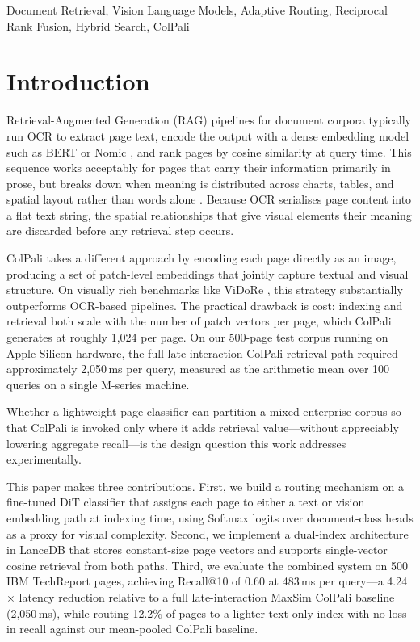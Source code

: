 \documentclass[conference]{IEEEtran}
\begin{document}
\begin{IEEEkeywords}
Document Retrieval, Vision Language Models, Adaptive Routing, Reciprocal Rank Fusion, Hybrid Search, ColPali
\end{IEEEkeywords}
 
\section{Introduction}
 
Retrieval-Augmented Generation (RAG) pipelines for document corpora typically run OCR to extract page text, encode the output with a dense embedding model such as BERT \cite{devlin2019} or Nomic \cite{nussbaum2024nomic}, and rank pages by cosine similarity at query time. This sequence works acceptably for pages that carry their information primarily in prose, but breaks down when meaning is distributed across charts, tables, and spatial layout rather than words alone \cite{blecher2023nougat}. Because OCR serialises page content into a flat text string, the spatial relationships that give visual elements their meaning are discarded before any retrieval step occurs.
 
ColPali \cite{faysse2024colpali} takes a different approach by encoding each page directly as an image, producing a set of patch-level embeddings that jointly capture textual and visual structure. On visually rich benchmarks like ViDoRe \cite{faysse2024vidore}, this strategy substantially outperforms OCR-based pipelines. The practical drawback is cost: indexing and retrieval both scale with the number of patch vectors per page, which ColPali generates at roughly 1,024 per page. On our 500-page test corpus running on Apple Silicon hardware, the full late-interaction ColPali retrieval path required approximately 2,050\,ms per query, measured as the arithmetic mean over 100 queries on a single M-series machine.
 
Whether a lightweight page classifier can partition a mixed enterprise corpus so that ColPali is invoked only where it adds retrieval value—without appreciably lowering aggregate recall—is the design question this work addresses experimentally.
 
This paper makes three contributions. First, we build a routing mechanism on a fine-tuned DiT \cite{li2022dit} classifier that assigns each page to either a text or vision embedding path at indexing time, using Softmax logits over document-class heads as a proxy for visual complexity. Second, we implement a dual-index architecture in LanceDB \cite{lancedb2024} that stores constant-size page vectors and supports single-vector cosine retrieval from both paths. Third, we evaluate the combined system on 500 IBM TechReport pages, achieving Recall@10 of 0.60 at 483\,ms per query—a 4.24$\times$ latency reduction relative to a full late-interaction MaxSim ColPali baseline (2,050\,ms), while routing 12.2\% of pages to a lighter text-only index with no loss in recall against our mean-pooled ColPali baseline.
 
\end{document}
